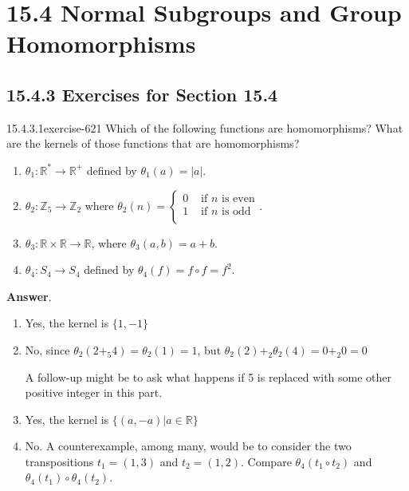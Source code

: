 \documentclass[twoside,10pt,]{book}
\numberwithin{equation}{section}
\begin{document}
\section*{15.4 Normal Subgroups and Group Homomorphisms}
\subsection*{15.4.3 Exercises for Section 15.4}
\begin{divisionsolution}{15.4.3.1}{}{exercise-621}%
\hypertarget{p-5590}{}%
Which of the following functions are homomorphisms? What are the kernels of those functions that are homomorphisms?\leavevmode%
\begin{enumerate}[label=(\alph*)]
\item\hypertarget{li-2468}{}\hypertarget{p-5591}{}%
\(\theta_1: \mathbb{R}^* \to  \mathbb{R}^+\) defined by \(\theta_1(a) =\left| a\right|\).%
\item\hypertarget{li-2469}{}\hypertarget{p-5592}{}%
\(\theta_2 : \mathbb{Z}_5 \rightarrow  \mathbb{Z}_2\) where \(\theta_2(n) =\left\{
\begin{array}{cc}
0 & \textrm{ if } n \textrm{ is even} \\
1 & \textrm{ if } n \textrm{ is odd} \\
\end{array}
\right.\).%
\item\hypertarget{li-2470}{}\hypertarget{p-5593}{}%
\(\theta_3 : \mathbb{R} \times  \mathbb{R} \rightarrow  \mathbb{R}\), where \(\theta_3(a, b) = a + b\).%
\item\hypertarget{li-2471}{}\hypertarget{p-5594}{}%
\(\theta_4 : S_4 \to S_4\) defined by \(\theta_4(f) = f\circ f=f^2\).%
\end{enumerate}
%
\par\smallskip%
\noindent\textbf{Answer}.\quad%
\hypertarget{p-5595}{}%
\leavevmode%
\begin{enumerate}[label=(\alph*)]
\item\hypertarget{li-2472}{}\hypertarget{p-5596}{}%
Yes, the kernel is \(\{1, -1\}\)%
\item\hypertarget{li-2473}{}\hypertarget{p-5597}{}%
No, since \(\theta _2\left(2 +_{5} 4\right)= \theta_2(1)=1\), but  \(\theta _2(2)+_2\theta_{2} (4)=0+_{2}0 =0\)%
\par
\hypertarget{p-5598}{}%
A follow-up might be to ask what happens if 5 is replaced with some other positive integer in this part.%
\item\hypertarget{li-2474}{}\hypertarget{p-5599}{}%
Yes, the kernel is \(\{(a, -a)| a \in \mathbb{R}\}\)%
\item\hypertarget{li-2475}{}\hypertarget{p-5600}{}%
No.  A counterexample, among many, would be to consider the two transpositions \(t_1=(1,3)\) and \(t_2=(1,2)\).  Compare \(\theta_4(t_1 \circ t_2)\) and \(\theta_4(t_1) \circ \theta_4(t_2)\).%
\end{enumerate}
%
\end{divisionsolution}%
\end{document}
